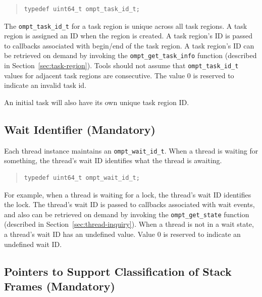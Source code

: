 \documentclass{article}
\begin{document}
\begin{quote}
\begin{verbatim}
typedef uint64_t ompt_task_id_t;
\end{verbatim}
\end{quote}


\noindent
  The \verb|ompt_task_id_t| for a task region is unique
  across all task regions.    A task region is assigned an ID
  when the region is created. A task region's ID is
  passed to callbacks associated with begin/end of the
  task region. A task region's ID can be retrieved
  on demand by invoking the \verb|ompt_get_task_info|  function (described in Section~\ref{sec:task-region}).
  Tools should not assume that \verb|ompt_task_id_t| values for adjacent
  task regions are consecutive. 
  The value 0 is reserved to indicate an invalid task id.
  
  An initial task will also have its own unique task region ID.
  

 
\subsection{Wait Identifier (Mandatory)}

  Each thread instance maintains an \verb|ompt_wait_id_t|. When a thread is waiting for something, the thread's wait ID identifies what the thread is awaiting. 


\begin{quote}
\begin{verbatim}
typedef uint64_t ompt_wait_id_t;
\end{verbatim}
\end{quote}

\noindent
For example, when a
  thread is waiting for a lock, the thread's wait ID identifies the lock.   The thread's wait ID is passed to
  callbacks associated with wait events, and also can be retrieved on
  demand by invoking the \verb|ompt_get_state| function (described in Section~\ref{sec:thread-inquiry}).
    When a thread is not in a wait state, a thread's wait ID has an undefined value.
  Value 0 is reserved to indicate an undefined wait ID.
 
\subsection{Pointers to Support Classification of Stack Frames (Mandatory)}
\end{document}
